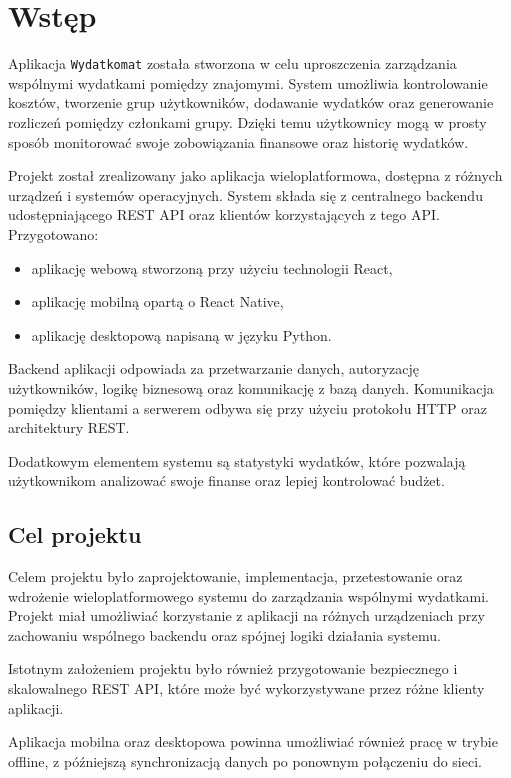 \chapter{Wstęp}

Aplikacja \verb|Wydatkomat| została stworzona w celu uproszczenia zarządzania wspólnymi wydatkami pomiędzy znajomymi. System umożliwia kontrolowanie kosztów, tworzenie grup użytkowników, dodawanie wydatków oraz generowanie rozliczeń pomiędzy członkami grupy. Dzięki temu użytkownicy mogą w prosty sposób monitorować swoje zobowiązania finansowe oraz historię wydatków.

Projekt został zrealizowany jako aplikacja wieloplatformowa, dostępna z różnych urządzeń i systemów operacyjnych. System składa się z centralnego backendu udostępniającego REST API oraz klientów korzystających z tego API. Przygotowano:
\begin{itemize}
	\item aplikację webową stworzoną przy użyciu technologii React,
	\item aplikację mobilną opartą o React Native,
	\item aplikację desktopową napisaną w języku Python.
\end{itemize}

Backend aplikacji odpowiada za przetwarzanie danych, autoryzację użytkowników, logikę biznesową oraz komunikację z bazą danych. Komunikacja pomiędzy klientami a serwerem odbywa się przy użyciu protokołu HTTP oraz architektury REST.

Dodatkowym elementem systemu są statystyki wydatków, które pozwalają użytkownikom analizować swoje finanse oraz lepiej kontrolować budżet.

\section{Cel projektu}

Celem projektu było zaprojektowanie, implementacja, przetestowanie oraz wdrożenie wieloplatformowego systemu do zarządzania wspólnymi wydatkami. Projekt miał umożliwiać korzystanie z aplikacji na różnych urządzeniach przy zachowaniu wspólnego backendu oraz spójnej logiki działania systemu.

Istotnym założeniem projektu było również przygotowanie bezpiecznego i skalowalnego REST API, które może być wykorzystywane przez różne klienty aplikacji.

Aplikacja mobilna oraz desktopowa powinna umożliwiać również pracę w trybie offline, z późniejszą synchronizacją danych po ponownym połączeniu do sieci.


